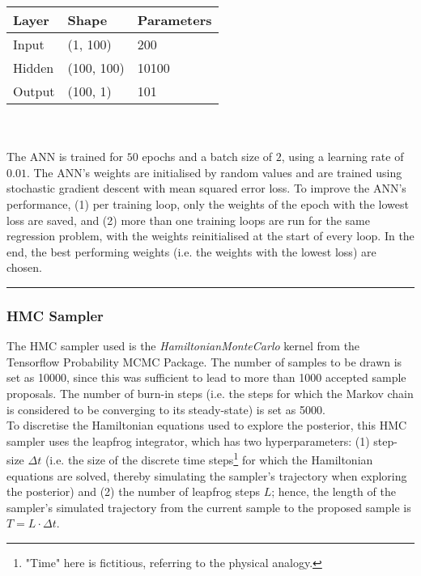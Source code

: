 \documentclass[conference]{IEEEtran}
\begin{document}
\begin{tabular}{| m{2cm} | m{2cm} | m{2cm} |}
    \hline
    \textbf{Layer} & \textbf{Shape} & \textbf{Parameters} \\
    \hline
    Input & (1, 100) & 200 \\
    \hline
    Hidden & (100, 100) & 10100 \\
    \hline
    Output & (100, 1) & 101 \\
    \hline
\end{tabular} \\~\\

The ANN is trained for $50$ epochs and a batch size of $2$, using a learning rate of $0.01$. The ANN's weights are initialised by random values and are trained using stochastic gradient descent with mean squared error loss. To improve the ANN's performance, (1) per training loop, only the weights of the epoch with the lowest loss are saved, and (2) more than one training loops are run for the same regression problem, with the weights reinitialised at the start of every loop. In the end, the best performing weights (i.e. the weights with the lowest loss) are chosen.

\par\noindent\rule{0.49\textwidth}{0.1pt}

\subsubsection{HMC Sampler}
The HMC sampler used is the \textit{HamiltonianMonteCarlo} kernel from the Tensorflow Probability MCMC Package. The number of samples to be drawn is set as 10000, since this was sufficient to lead to more than 1000 accepted sample proposals. The number of burn-in steps (i.e. the steps for which the Markov chain is considered to be converging to its steady-state) is set as 5000.\\

To discretise the Hamiltonian equations used to explore the posterior, this HMC sampler uses the leapfrog integrator, which has two hyperparameters: (1) step-size $\Delta t$ (i.e. the size of the discrete time steps\footnote{"Time" here is fictitious, referring to the physical analogy.} for which the Hamiltonian equations are solved, thereby simulating the sampler's trajectory when exploring the posterior) and (2) the number of leapfrog steps $L$; hence, the length of the sampler's simulated trajectory from the current sample to the proposed sample is $T = L \cdot \Delta t$.\\
\end{document}
